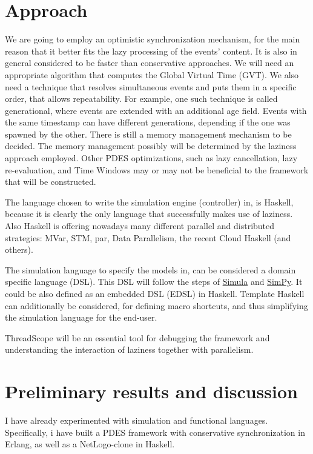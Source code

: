 \documentclass[a4paper]{article}
\begin{document}
\section{Approach}

We are going to employ an optimistic synchronization mechanism, for the main reason
that it better fits the lazy processing of the events' content. It is also in general
considered to be faster than conservative approaches.
We will need an appropriate algorithm that computes the Global Virtual Time (GVT).
We also need a technique that resolves simultaneous events and puts them in a specific order,
that allows repeatability. For example, one such technique is called generational,
where events are extended with an additional age field. Events with the same timestamp
can have different generations, depending if the one was spawned by the other.
There is still a memory management mechanism to be decided. The memory management possibly will
be determined by the laziness approach employed. Other PDES optimizations, such
as lazy cancellation, lazy re-evaluation, and Time Windows may or may not be beneficial
to the framework that will be constructed.

The language chosen to write the simulation engine (controller) in, is Haskell, because
it is clearly the only language that successfully makes use of laziness.
Also Haskell is offering nowadays many different parallel and distributed strategies:
MVar, STM, par, Data Parallelism, the recent Cloud Haskell (and others).

The simulation language to specify the models in, can be considered a domain specific language (DSL).
This DSL will follow the steps of \href{http://en.wikipedia.org/wiki/Simula}{Simula} and \href{http://simpy.sourceforge.net/}{SimPy}. It could be also defined as an embedded DSL (EDSL) in Haskell.
Template Haskell can additionally be considered, for defining macro shortcuts, and thus
simplifying the simulation language for the end-user. 

ThreadScope will be an essential tool for debugging the framework and understanding
the interaction of laziness together with parallelism.

\section{Preliminary results and discussion}

I have already experimented with simulation and functional languages. Specifically, i have built
a PDES framework with conservative synchronization in Erlang,
as well as a NetLogo-clone in Haskell.
\end{document}
